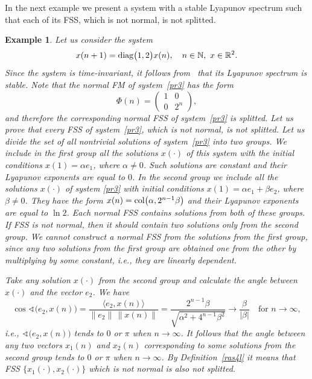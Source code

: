 \documentclass[11pt]{article}
\newtheorem{example}[theorem]{Example}
\begin{document}
In the next example we present a system with 
a stable Lyapunov spectrum such
that each 
of its FSS, which is not normal, is not splitted.

\begin{example}
\label{primer3} Let us consider the system 
\begin{equation}
x(n+1)=\mathop{\rm diag}\bigl(1,2\bigr)x(n),\quad n\in \mathbb{N},\ x\in 
\mathbb{R}^{2}.  \label{pr3}
\end{equation}%
Since the system is time-invariant, it follows from~\cite{BP} that its
Lyapunov spectrum is stable. Note that the normal FM of system~\eqref{pr3}
has the form 
\begin{equation*}
\Phi (n)=\left( 
\begin{array}{cc}
1 & 0 \\ 
0 & 2^{n}%
\end{array}%
\right) ,
\end{equation*}%
and therefore the corresponding normal FSS of system~\eqref{pr3} is
splitted. Let us prove that every FSS of system~\eqref{pr3}, which is not
normal, is not splitted. Let us divide the set of all nontrivial solutions
of system~\eqref{pr3} into two groups. We include 
in the first group all
the solutions $x(\cdot )$ of this system with the initial conditions $%
x(1)=\alpha e_{1}$, where $\alpha \neq 0 $. Such solutions are constant and
their Lyapunov exponents are equal to $0$. 
In the second group we include
all the solutions $x(\cdot )$ of system \eqref{pr3} with initial conditions $%
x(1)=\alpha e_{1}+\beta e_{2}$, where $\beta \neq 0$. They have the form $%
x(n)=\mathop{\rm
col}\bigl(\alpha ,2^{n-1}\beta \bigr)$ and their Lyapunov exponents are
equal to $\ln 2$. Each normal FSS contains solutions from both of these
groups. If FSS is not normal, then it should contain two solutions only from
the second group. We cannot construct a normal FSS from the solutions from
the first group, since any two solutions from the first group are obtained
one from the other by multiplying by some constant, i.e., they are linearly
dependent.

Take any solution $x(\cdot )$ from the second group and calculate the angle
between 
$x(\cdot )$  and the vector $e_{2}$. We have 
\begin{equation*}
\cos \sphericalangle \bigl(e_{2},x(n)\bigr)=\frac{\langle e_{2},x(n)\rangle 
}{\| e_{2}\| \,\| x(n)\| }=
\frac{2^{n-1}\beta }{\sqrt{\alpha ^{2}+4^{n-1}\beta ^{2}}}\to 
\frac{\beta }{|\beta |}\quad \text{for\ }n\to \infty ,
\end{equation*}%
i.e., $\sphericalangle \bigl(e_{2},x(n)\bigr)$ tends to $0$ or $\pi $ when $%
n\to \infty $. It follows that the angle between any two vectors $%
x_{1}(n)$ and $x_{2}(n)$ corresponding to some solutions from the second
group tends to $0$ or $\pi $ when $n\to \infty $. By Definition~\ref{ras4l} it
means that FSS $\bigl\{x_{1}(\cdot ),x_{2}(\cdot )\bigr\}$ which is not
normal is also not splitted.
\end{example}
\end{document}
